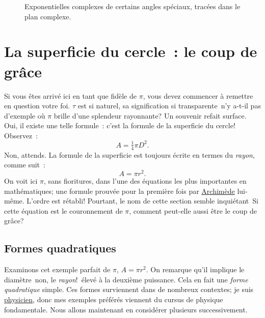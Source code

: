\begin{figure}
\begin{center}
\end{center}
\caption{Exponentielles complexes de certains angles spéciaux, tracées dans le
plan complexe.\label{fig:tau_euler_circle}}
\end{figure}


\section{La superficie du cercle~: le coup de grâce} %
\label{sec:circular_area}

Si vous êtes arrivé ici en tant que fidèle de $\pi$, vous devez commencer à
remettre en question votre foi. $\tau$ est si naturel, sa signification
si transparente\textellipsis\ n'y a-t-il pas d'exemple où $\pi$ brille d'une
splendeur rayonnante\ns? Un souvenir refait surface. Oui, il existe une telle
formule~: c'est la formule de la superficie du cercle\ns! Observez~:
\[ A = \tfrac{1}{4} \pi D^2. \]
Non, attends. La formule de la superficie est toujours écrite en termes du
\emph{rayon}, comme suit~:
\[ A = \pi r^2. \]
On voit ici $\pi$, sans fioritures, dans l'une des équations les plus
importantes en mathématiques\ns; une formule prouvée pour la première fois par
\href{https://fr.wikipedia.org/wiki/Archimède}{Archimède} lui-même. L'ordre est
rétabli\ns! Pourtant, le nom de cette section semble inquiétant\textellipsis\
Si cette équation est le couronnement de $\pi$, comment peut-elle aussi être le
coup de grâce\ns?


  \subsection{Formes quadratiques} %
  \label{sec:quadratic_forms}

Examinons cet exemple parfait de $\pi$, $A = \pi r^2$. On remarque qu'il implique
le diamètre\textellipsis\ non, le \emph{rayon}\ns !\ élevé à la deuxième puissance.
Cela en fait une \emph{forme quadratique} simple. Ces formes surviennent
dans de nombreux contextes\ns; je suis
\href{https://translate.google.com/translate?hl=en&sl=en&tl=fr&u=https://thesis.library.caltech.edu/1940/}{physicien},
donc mes exemples
préférés viennent du cursus de physique fondamentale. Nous allons maintenant en
considérer plusieurs successivement.

